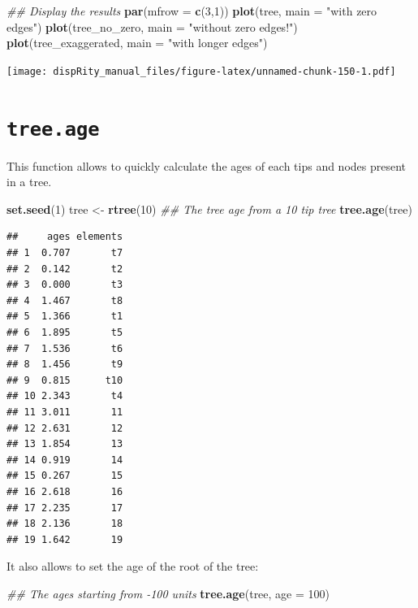 \documentclass[]{book}
\newenvironment{Shaded}{\begin{snugshade}}{\end{snugshade}}
\newcommand{\CommentTok}[1]{\textcolor[rgb]{0.56,0.35,0.01}{\textit{#1}}}
\newcommand{\DataTypeTok}[1]{\textcolor[rgb]{0.13,0.29,0.53}{#1}}
\newcommand{\DecValTok}[1]{\textcolor[rgb]{0.00,0.00,0.81}{#1}}
\newcommand{\KeywordTok}[1]{\textcolor[rgb]{0.13,0.29,0.53}{\textbf{#1}}}
\newcommand{\NormalTok}[1]{#1}
\newcommand{\StringTok}[1]{\textcolor[rgb]{0.31,0.60,0.02}{#1}}
\begin{document}
\begin{Shaded}
\begin{Highlighting}[]
\CommentTok{## Display the results}
\KeywordTok{par}\NormalTok{(}\DataTypeTok{mfrow =} \KeywordTok{c}\NormalTok{(}\DecValTok{3}\NormalTok{,}\DecValTok{1}\NormalTok{))}
\KeywordTok{plot}\NormalTok{(tree, }\DataTypeTok{main =} \StringTok{"with zero edges"}\NormalTok{)}
\KeywordTok{plot}\NormalTok{(tree_no_zero, }\DataTypeTok{main =} \StringTok{"without zero edges!"}\NormalTok{)}
\KeywordTok{plot}\NormalTok{(tree_exaggerated, }\DataTypeTok{main =} \StringTok{"with longer edges"}\NormalTok{)}
\end{Highlighting}
\end{Shaded}

\texttt{[image: dispRity\_manual\_files/figure-latex/unnamed-chunk-150-1.pdf]}

\hypertarget{tree.age}{%
\section{\texorpdfstring{\texttt{tree.age}}{tree.age}}\label{tree.age}}

This function allows to quickly calculate the ages of each tips and nodes present in a tree.

\begin{Shaded}
\begin{Highlighting}[]
\KeywordTok{set.seed}\NormalTok{(}\DecValTok{1}\NormalTok{)}
\NormalTok{tree <-}\StringTok{ }\KeywordTok{rtree}\NormalTok{(}\DecValTok{10}\NormalTok{)}
\CommentTok{## The tree age from a 10 tip tree}
\KeywordTok{tree.age}\NormalTok{(tree)}
\end{Highlighting}
\end{Shaded}

\begin{verbatim}
##     ages elements
## 1  0.707       t7
## 2  0.142       t2
## 3  0.000       t3
## 4  1.467       t8
## 5  1.366       t1
## 6  1.895       t5
## 7  1.536       t6
## 8  1.456       t9
## 9  0.815      t10
## 10 2.343       t4
## 11 3.011       11
## 12 2.631       12
## 13 1.854       13
## 14 0.919       14
## 15 0.267       15
## 16 2.618       16
## 17 2.235       17
## 18 2.136       18
## 19 1.642       19
\end{verbatim}

It also allows to set the age of the root of the tree:

\begin{Shaded}
\begin{Highlighting}[]
\CommentTok{## The ages starting from -100 units}
\KeywordTok{tree.age}\NormalTok{(tree, }\DataTypeTok{age =} \DecValTok{100}\NormalTok{)}
\end{Highlighting}
\end{Shaded}
\end{document}
